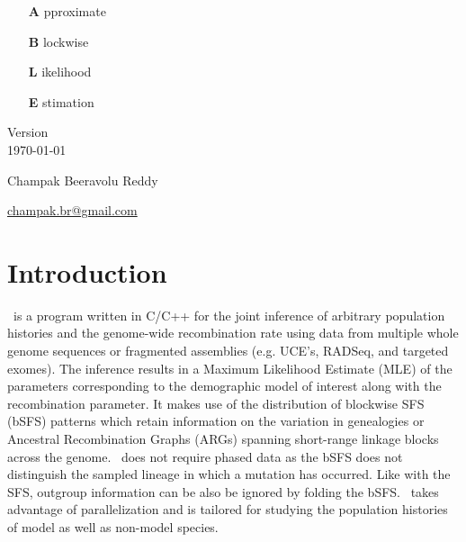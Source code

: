\documentclass[pdftex,12pt]{article}
\newcommand{\incode}[1]{\tcbox[colback=blue!10!gray!10, colframe=blue!10!gray!40, boxrule=0.5pt, on line, size=fbox]{\texttt{\detokenize{#1}}}}
\newcommand{\ABLE}{\incode{ABLE}}
\newcommand{\RED}[1]{\textcolor{red}{\detokenize{#1}}}
\begin{document}
\begin{titlepage}
\centering
\vspace*{\fill}

\begin{center}
\begin{adjustwidth}{2.4in}{0in}
	\begin{itemize}
		\item [{\Huge \textbf{A}}] pproximate
		\item [{\Huge \textbf{B}}] lockwise
		\item [{\Huge \textbf{L}}] ikelihood
		\item [{\Huge \textbf{E}}] stimation
	\end{itemize}
\end{adjustwidth}
\end{center}

\vspace{1cm}

Version \RED{0.1.x} \\
\today

\vspace{2cm}

{\large Champak Beeravolu Reddy}

\href{mailto:champak.br@gmail.com}{champak.br@gmail.com}

\vspace*{\fill}
\end{titlepage}

\vspace*{3cm}
\tableofcontents
\vspace*{\fill}

\clearpage


\section{Introduction}
\ABLE\ is a program written in C/C++ for the joint inference of arbitrary population histories and the genome-wide recombination rate using data from multiple whole genome sequences or fragmented assemblies (e.g. UCE's, RADSeq, and targeted exomes). The inference results in a Maximum Likelihood Estimate (MLE) of the parameters corresponding to the demographic model of interest along with the recombination parameter. It makes use of the distribution of blockwise SFS (bSFS) patterns which retain information on the variation in genealogies or Ancestral Recombination Graphs (ARGs) spanning short-range linkage blocks across the genome. \ABLE\ does not require phased data as the bSFS does not distinguish the sampled lineage in which a mutation has occurred. Like with the SFS, outgroup information can be also be ignored by folding the bSFS. \ABLE\ takes advantage of \incode{openmp} parallelization and is tailored for studying the population histories of model as well as non-model species.
\end{document}
